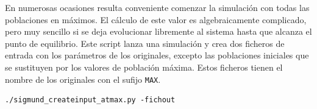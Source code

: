 En numerosas ocasiones resulta conveniente comenzar la simulación con todas las poblaciones en máximos. El cálculo de este valor es
algebraicamente complicado, pero muy sencillo si se deja evolucionar libremente al sistema hasta que alcanza el punto de equilibrio.
Este script lanza una simulación y crea dos ficheros de entrada con los parámetros de los originales, excepto las poblaciones iniciales
que se sustituyen por los valores de población máxima. Estos ficheros tienen el nombre de los originales con el sufijo \texttt{MAX}.

\fontsize{3.5mm}{3.5mm}\selectfont
\begin{verbatim}
./sigmund_createinput_atmax.py -fichout
\end{verbatim}
\normalsize


\normalsize

